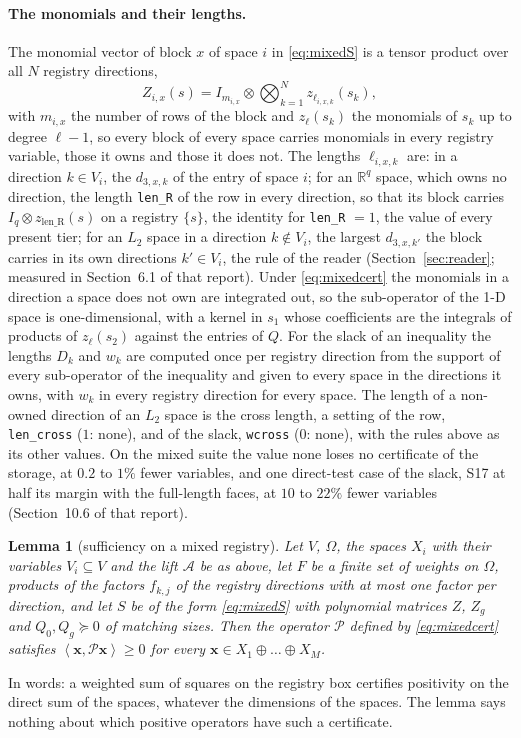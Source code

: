 \documentclass[12pt]{article}
\newcommand{\R}{\mathbb{R}}
\newcommand{\mcl}[1]{\mathcal{#1}}
\newcommand{\mbf}[1]{\mathbf{#1}}
\newcommand{\ip}[2]{\left\langle #1,#2\right\rangle}
\newcommand{\code}[1]{\texttt{#1}}
\newcommand{\readerref}{Section~6.1 of that report}
\newcommand{\blcrossref}{Section~10.6 of that report}
\theoremstyle{plain}
\newtheorem{lemma}[theorem]{Lemma}
\theoremstyle{definition}
\theoremstyle{remark}
\begin{document}
\paragraph{The monomials and their lengths.} The monomial vector of block $x$ of space $i$ in \eqref{eq:mixedS} is a tensor product over all $N$ registry directions,
\begin{equation}\label{eq:mixedZ}
Z_{i,x}(s)=I_{m_{i,x}}\otimes\bigotimes_{k=1}^{N}z_{\ell_{i,x,k}}(s_k),
\end{equation}
with $m_{i,x}$ the number of rows of the block and $z_\ell(s_k)$ the monomials of $s_k$ up to degree $\ell-1$, so every block of every space carries monomials in every registry variable, those it owns and those it does not. The lengths $\ell_{i,x,k}$ are: in a direction $k\in V_i$, the $d_{3,x,k}$ of the entry of space $i$; for an $\R^q$ space, which owns no direction, the length \code{len\_R} of the row in every direction, so that its block carries $I_q\otimes z_{\mathrm{len\_R}}(s)$ on a registry $\{s\}$, the identity for \code{len\_R} $=1$, the value of every present tier; for an $L_2$ space in a direction $k\notin V_i$, the largest $d_{3,x,k'}$ the block carries in its own directions $k'\in V_i$, the rule of the reader (Section~\ref{sec:reader}; measured in \readerref). Under \eqref{eq:mixedcert} the monomials in a direction a space does not own are integrated out, so the sub-operator of the 1-D space is one-dimensional, with a kernel in $s_1$ whose coefficients are the integrals of products of $z_\ell(s_2)$ against the entries of $Q$. For the slack of an inequality the lengths $D_k$ and $w_k$ are computed once per registry direction from the support of every sub-operator of the inequality and given to every space in the directions it owns, with $w_k$ in every registry direction for every space. The length of a non-owned direction of an $L_2$ space is the cross length, a setting of the row, \code{len\_cross} ($1$: none), and of the slack, \code{wcross} ($0$: none), with the rules above as its other values. On the mixed suite the value none loses no certificate of the storage, at $0.2$ to $1\%$ fewer variables, and one direct-test case of the slack, S17 at half its margin with the full-length faces, at $10$ to $22\%$ fewer variables (\blcrossref).

\begin{lemma}[sufficiency on a mixed registry]\label{lem:mixedsuff}
Let $V$, $\Omega$, the spaces $X_i$ with their variables $V_i\subseteq V$ and the lift $\mcl A$ be as above, let $F$ be a finite set of weights on $\Omega$, products of the factors $f_{k,j}$ of the registry directions with at most one factor per direction, and let $S$ be of the form \eqref{eq:mixedS} with polynomial matrices $Z$, $Z_g$ and $Q_0,Q_g\succeq0$ of matching sizes. Then the operator $\mcl P$ defined by \eqref{eq:mixedcert} satisfies $\ip{\mbf x}{\mcl P\mbf x}\ge0$ for every $\mbf x\in X_1\oplus\dots\oplus X_M$.
\end{lemma}
In words: a weighted sum of squares on the registry box certifies positivity on the direct sum of the spaces, whatever the dimensions of the spaces. The lemma says nothing about which positive operators have such a certificate.
\end{document}
